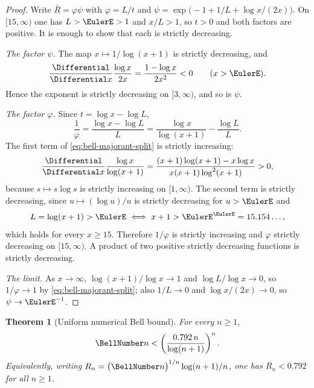 \documentclass[11pt,a4paper,oneside,openany]{book}
\newtheorem{theorem}{Theorem}[chapter]
\theoremstyle{definition}
\theoremstyle{remark}
\begin{document}
\begin{proof}
Write $\bar R=\varphi\psi$ with $\varphi=L/t$ and
$\psi=\exp\bigl(-1+1/L+\log x/(2x)\bigr)$.  On $[15,\infty)$ one has
$L>\EulerE>1$ and $x/L>1$, so $t>0$ and both factors are positive.  It is
enough to show that each is strictly decreasing.

\emph{The factor $\psi$.}  The map $x\mapsto1/\log(x+1)$ is strictly
decreasing, and
\[
 \frac{\Differential}{\Differential x}\frac{\log x}{2x}=\frac{1-\log x}{2x^2}<0
 \qquad(x>\EulerE).
\]
Hence the exponent is strictly decreasing on $[3,\infty)$, and so is $\psi$.

\emph{The factor $\varphi$.}  Since $t=\log x-\log L$,
\begin{equation}
 \frac1\varphi=\frac{\log x-\log L}{L}
 =\frac{\log x}{\log(x+1)}-\frac{\log L}{L}.                      \label{eq:bell-majorant-split}
\end{equation}
The first term of \eqref{eq:bell-majorant-split} is strictly increasing:
\[
 \frac{\Differential}{\Differential x}\frac{\log x}{\log(x+1)}
 =\frac{(x+1)\log(x+1)-x\log x}{x(x+1)\log^2(x+1)}>0,
\]
because $s\mapsto s\log s$ is strictly increasing on $[1,\infty)$.  The second
term is strictly decreasing, since $u\mapsto(\log u)/u$ is strictly decreasing
for $u>\EulerE$ and
\[
 L=\log(x+1)>\EulerE
 \iff x+1>\EulerE^{\EulerE}=15.154\ldots,
\]
which holds for every $x\ge15$.  Therefore $1/\varphi$ is strictly increasing
and $\varphi$ strictly decreasing on $[15,\infty)$.  A product of two positive
strictly decreasing functions is strictly decreasing.

\emph{The limit.}  As $x\to\infty$, $\log(x+1)/\log x\to1$ and
$\log L/\log x\to0$, so $1/\varphi\to1$ by \eqref{eq:bell-majorant-split};
also $1/L\to0$ and $\log x/(2x)\to0$, so $\psi\to\EulerE^{-1}$.
\end{proof}

\begin{theorem}[Uniform numerical Bell bound]\label{thm:bell-numerical-bound}
For every $n\ge1$,
\begin{equation}
 \BellNumber n<\left(\frac{0.792\,n}{\log(n+1)}\right)^n.        \label{eq:bell-numerical-bound}
\end{equation}
Equivalently, writing
$R_n=\bigl(\BellNumber n\bigr)^{1/n}\log(n+1)/n$, one has $R_n<0.792$ for all
$n\ge1$.
\end{theorem}
\end{document}
